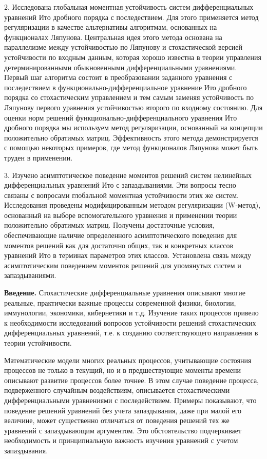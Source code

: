 2. Исследована глобальная моментная устойчивость систем
дифференциальных уравнений Ито дробного порядка с последествием. Для
этого применяется метод регуляризации в качестве альтернативы
алгоритмам, основанных на функционалах Ляпунова. Центральная идея
этого метода основана на параллелизме между устойчивостью по
Ляпунову и стохастической версией устойчивости по входным данным,
которая хорошо известна в теории управления детерминированными
обыкновенными дифференциальными уравнениями. Первый шаг алгоритма
состоит в преобразовании заданного уравнения с последествием в
функционально-дифференциальное уравнение Ито дробного порядка со
стохастическим управлением и тем самым заменяя устойчивость по
Ляпунову первого уравнения устойчивостью  второго по входному
состоянию. Для оценки норм решений функционально-дифференциального
уравнения Ито дробного порядка мы используем метод регуляризации,
основанный на концепции положительно обратимых матриц. Эффективность
этого метода демонстрируется с помощью некоторых примеров, где метод
функционалов Ляпунова может быть труден в применении. 
\smallskip

3. Изучено  асимптотическое поведение моментов решений систем
нелинейных дифференциальных уравнений Ито с запаздываниями. Эти
вопросы тесно связаны с вопросами глобальной моментная устойчивости
этих же систем. Исследования проведены модифицированным методом
регуляризации (W-метод), основанный на выборе вспомогательного
уравнения и применении теории положительно обратимых матриц.
Получены достаточные условия, обеспечивающие наличие определенного
асимптотического поведения для моментов решений как для достаточно
общих, так и конкретных классов уравнений Ито в терминах параметров
этих классов. Установлена связь между асимптотическим поведением
моментов решений для упомянутых систем и запаздываниями. 
\smallskip


\textbf{Введение.} Стохастические дифференциальные уравнения
описывают многие реальные, практически важные процессы современной
физики, биологии, иммунологии, экономики, кибернетики и т.д.
Изучение таких процессов привело к необходимости исследований
вопросов устойчивости решений стохастических дифференциальных
уравнений, т.е. к созданию соответствующего направления в теории
устойчивости.

Математические модели многих реальных процессов, учитывающие
состояния процессов не только в текущий, но и в предшествующие
моменты времени описывают развитие процессов более точнее. В этом
случае поведение процесса, подверженного случайным воздействиям,
описывается стохастическими дифференциальными уравнениями с
последействием. Примеры показывают, что поведение решений уравнений
без учета запаздывания, даже при малой его величине, может
существенно отличаться от поведения решений тех же уравнений с
запаздывающим аргументом. Это обстоятельство подчеркивает
необходимость и принципиальную важность изучения уравнений с учетом
запаздывания.

